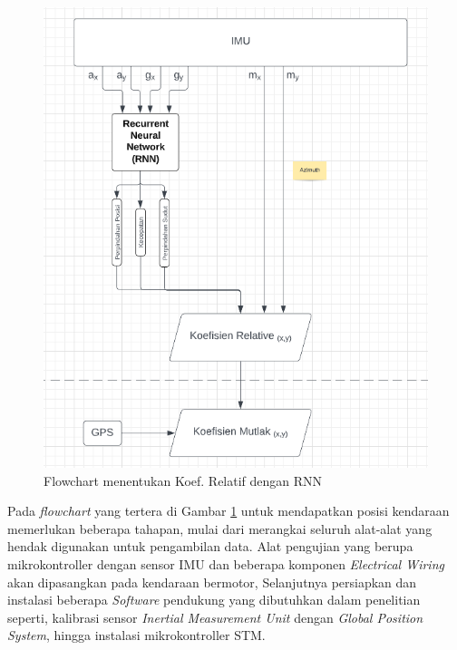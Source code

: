 \begin{figure} [ht] \centering
  \includegraphics[scale=0.55]{gambar/IMU-to-KRel-KMut.png}
  \caption{Flowchart menentukan Koef. Relatif dengan RNN}
  \label{fig:Koef-Relatif}
\end{figure}

Pada \emph{flowchart} yang tertera di Gambar \ref{fig:Koef-Relatif} untuk mendapatkan posisi kendaraan memerlukan beberapa tahapan, mulai dari merangkai
seluruh alat-alat yang hendak digunakan untuk pengambilan data. Alat pengujian yang berupa mikrokontroller dengan sensor IMU dan beberapa komponen \emph{Electrical Wiring} 
akan dipasangkan pada kendaraan bermotor, Selanjutnya persiapkan dan instalasi beberapa \emph{Software} pendukung yang dibutuhkan dalam penelitian seperti,
kalibrasi sensor \emph{Inertial Measurement Unit} dengan \emph{Global Position System}, hingga instalasi mikrokontroller STM.  

